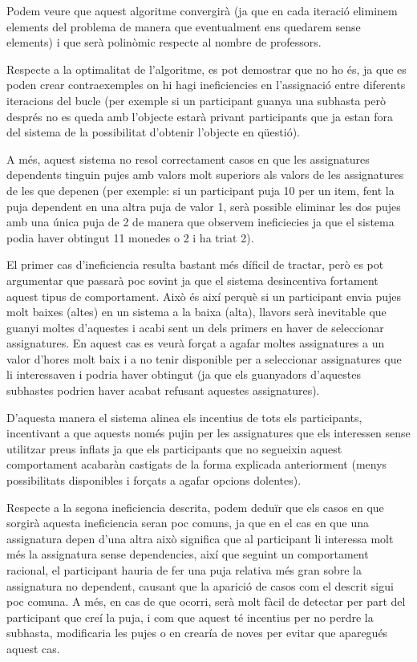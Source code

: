 \documentclass[10pt,twocolumn]{article}
\begin{document}
Podem veure que aquest algoritme convergirà (ja que en cada iteració eliminem elements del problema de manera que eventualment ens quedarem sense elements) i que serà polinòmic respecte al nombre de professors.

Respecte a la optimalitat de l'algoritme, es pot demostrar que no ho és, ja que es poden crear contraexemples on hi hagi ineficiencies en l'assignació entre diferents iteracions del bucle (per exemple si un participant guanya una subhasta però després no es queda amb l'objecte estarà privant participants que ja estan fora del sistema de la possibilitat d'obtenir l'objecte en qüestió). 

A més, aquest sistema no resol correctament casos en que les assignatures dependents tinguin pujes amb valors molt superiors als valors de les assignatures de les que depenen (per exemple: si un participant puja 10 per un item, fent la puja dependent en una altra puja de valor 1, serà possible eliminar les dos pujes amb una única puja de 2 de manera que observem ineficiecies ja que el sistema podia haver obtingut 11 monedes o 2 i ha triat 2).

El primer cas d'ineficiencia resulta bastant més díficil de tractar, però es pot argumentar que passarà poc sovint ja que el sistema desincentiva fortament aquest tipus de comportament. Això és així perquè si un participant envia pujes molt baixes (altes) en un sistema a la baixa (alta), llavors serà inevitable que guanyi moltes d'aquestes i acabi sent un dels primers en haver de seleccionar assignatures. En aquest cas es veurà forçat a agafar moltes assignatures a un valor d'hores molt baix i a no tenir disponible per a seleccionar assignatures que li interessaven i podria haver obtingut (ja que els guanyadors d'aquestes subhastes podrien haver acabat refusant aquestes assignatures). 

D'aquesta manera el sistema alinea els incentius de tots els participants, incentivant a que aquests només pujin per les assignatures que els interessen sense utilitzar preus inflats ja que els participants que no segueixin aquest comportament acabaràn castigats de la forma explicada anteriorment (menys possibilitats disponibles i forçats a agafar opcions dolentes).

Respecte a la segona ineficiencia descrita, podem deduïr que els casos en que sorgirà aquesta ineficiencia seran poc comuns, ja que en el cas en que una assignatura depen d'una altra això significa que al participant li interessa molt més la assignatura sense dependencies, així que seguint un comportament racional, el participant hauria de fer una puja relativa més gran sobre la assignatura no dependent, causant que la aparició de casos com el descrit sigui poc comuna. A més, en cas de que ocorri, serà molt fàcil de detectar per part del participant que creí la puja, i com que aquest té incentius per no perdre la subhasta, modificaria les pujes o en crearía de noves per evitar que aparegués aquest cas.
\end{document}

